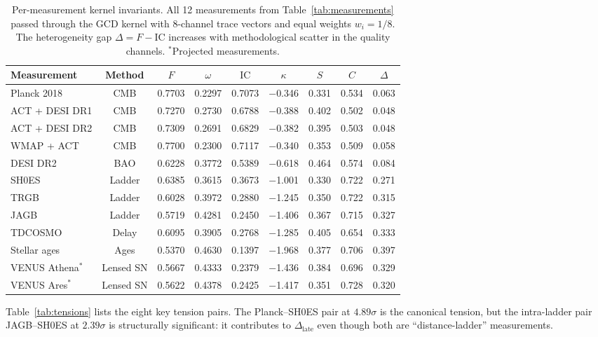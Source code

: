 \documentclass[
  aps,
  prd,
  twocolumn,
  superscriptaddress,
  nofootinbib,
  floatfix
]{revtex4-2}
\newcommand{\IC}{\mathrm{IC}}
\newcommand{\hetgap}{\Delta}
\newcommand{\Fid}{F}
\newcommand{\Drft}{\omega}
\newcommand{\Ent}{S}
\newcommand{\Curv}{C}
\newcommand{\Logint}{\kappa}
\begin{document}
\begin{table}[t]
\caption{\label{tab:individual}Per-measurement kernel invariants.
All 12 measurements from Table~\ref{tab:measurements} passed through
the GCD kernel with 8-channel trace vectors and equal weights
$w_i = 1/8$. The heterogeneity gap $\hetgap = \Fid - \IC$ increases
with methodological scatter in the quality channels.
$^*$Projected measurements.}
\begin{ruledtabular}
\begin{tabular}{lcccccccc}
Measurement & Method & $\Fid$ & $\Drft$ & $\IC$ & $\Logint$ & $\Ent$ &
$\Curv$ & $\hetgap$ \\
\hline
Planck 2018 & CMB & 0.7703 & 0.2297 & 0.7073 & $-$0.346 & 0.331 & 0.534 & 0.063 \\
ACT + DESI DR1 & CMB & 0.7270 & 0.2730 & 0.6788 & $-$0.388 & 0.402 & 0.502 & 0.048 \\
ACT + DESI DR2 & CMB & 0.7309 & 0.2691 & 0.6829 & $-$0.382 & 0.395 & 0.503 & 0.048 \\
WMAP + ACT & CMB & 0.7700 & 0.2300 & 0.7117 & $-$0.340 & 0.353 & 0.509 & 0.058 \\
DESI DR2 & BAO & 0.6228 & 0.3772 & 0.5389 & $-$0.618 & 0.464 & 0.574 & 0.084 \\
\hline
SH0ES & Ladder & 0.6385 & 0.3615 & 0.3673 & $-$1.001 & 0.330 & 0.722 & 0.271 \\
TRGB & Ladder & 0.6028 & 0.3972 & 0.2880 & $-$1.245 & 0.350 & 0.722 & 0.315 \\
JAGB & Ladder & 0.5719 & 0.4281 & 0.2450 & $-$1.406 & 0.367 & 0.715 & 0.327 \\
TDCOSMO & Delay & 0.6095 & 0.3905 & 0.2768 & $-$1.285 & 0.405 & 0.654 & 0.333 \\
Stellar ages & Ages & 0.5370 & 0.4630 & 0.1397 & $-$1.968 & 0.377 & 0.706 & 0.397 \\
\hline
VENUS Athena$^*$ & Lensed SN & 0.5667 & 0.4333 & 0.2379 & $-$1.436 & 0.384 & 0.696 & 0.329 \\
VENUS Ares$^*$ & Lensed SN & 0.5622 & 0.4378 & 0.2425 & $-$1.417 & 0.351 & 0.728 & 0.320 \\
\end{tabular}
\end{ruledtabular}
\end{table}

Table~\ref{tab:tensions} lists the eight key tension pairs.
The Planck--SH0ES pair at $4.89\sigma$ is the canonical
tension, but the intra-ladder pair JAGB--SH0ES at $2.39\sigma$
is structurally significant: it contributes to
$\hetgap_{\mathrm{late}}$ even though both are
``distance-ladder'' measurements.
\end{document}

